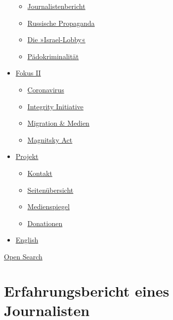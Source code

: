 \begin{itemize}
  \begin{itemize}
  \tightlist
  \item
    \href{https://swprs.org/bericht-eines-journalisten/}{Journalistenbericht}
  \item
    \href{https://swprs.org/russische-propaganda/}{Russische Propaganda}
  \item
    \href{https://swprs.org/die-israel-lobby-fakten-und-mythen/}{Die
    »Israel-Lobby«}
  \item
    \href{https://swprs.org/geopolitik-und-paedokriminalitaet/}{Pädokriminalität}
  \end{itemize}
\item
  \href{https://swprs.org/migration-und-medien/}{Fokus II}

  \begin{itemize}
  \tightlist
  \item
    \href{https://swprs.org/covid-19-hinweis-ii/}{Coronavirus}
  \item
    \href{https://swprs.org/die-integrity-initiative/}{Integrity
    Initiative}
  \item
    \href{https://swprs.org/migration-und-medien/}{Migration \& Medien}
  \item
    \href{https://swprs.org/der-fall-magnitsky/}{Magnitsky Act}
  \end{itemize}
\item
  \href{https://swprs.org/kontakt/}{Projekt}

  \begin{itemize}
  \tightlist
  \item
    \href{https://swprs.org/kontakt/}{Kontakt}
  \item
    \href{https://swprs.org/uebersicht/}{Seitenübersicht}
  \item
    \href{https://swprs.org/medienspiegel/}{Medienspiegel}
  \item
    \href{https://swprs.org/donationen/}{Donationen}
  \end{itemize}
\item
  \href{https://swprs.org/contact/}{English}
\end{itemize}

\protect\hyperlink{}{Open Search}

\hypertarget{erfahrungsbericht-eines-journalisten}{%
\section{Erfahrungsbericht eines
Journalisten}\label{erfahrungsbericht-eines-journalisten}}


